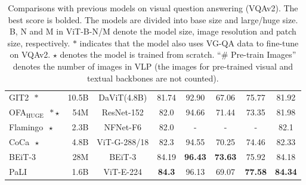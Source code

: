 \documentclass[letterpaper]{article} %
\newcommand{\modelhuge}[0]{$_{\text{HUGE}}$}
\begin{document}
\begin{table}[ht]
{\begin{tabular}{lrc|ccccc}
      GIT2~\citep{wang2022git}\,$\ast$\ & 10.5B & DaViT(4.8B) & 81.74 & 92.90 & 67.06 & 75.77 & 81.92 \\
      OFA\modelhuge{}~\citep{wang2022OFA}\,$\ast$\,$\star$ & 54M & ResNet-152 & 82.0 & 94.66 & 71.44 & 73.35 & 81.98 \\
      Flamingo~\citep{alayrac2022flamingo}\,$\star$ & 2.3B & NFNet-F6 & 82.0 & - & - & - & 82.1 \\
      CoCa~\citep{yu2022coca}\,$\star$ & 4.8B & ViT-G-288/18 & 82.3 & 94.55 & 70.25 & 74.46 & 82.33 \\
      BEiT-3~\citep{wang2022image} & 28M & BEiT-3 & 84.19 & \textbf{96.43} & \textbf{73.63} & 75.92 & 84.18 \\
      PaLI~\citep{chen2022pali} & 1.6B & ViT-E-224 & \textbf{84.3} & 96.13 & 69.07 & \textbf{77.58} & \textbf{84.34} \\
    \end{tabular}
    }
    \caption{
        Comparisons with previous models on visual question answering (VQAv2). The best score is bolded. The models are divided into base size and large/huge size. B, N and M in ViT-B-N/M denote the model size, image resolution and patch size, respectively. $\ast$ indicates that the model also uses VG-QA data to fine-tune on VQAv2. $\star$ denotes the model is trained from scratch. ``\# Pre-train Images'' denotes the number of images in VLP (the images for pre-trained visual and textual backbones are not counted). 
    }
    \label{tab:vqav2_results}
\end{table}
\end{document}
